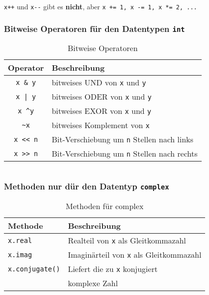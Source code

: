 \begin{achtung}
	\texttt{x++} und \texttt{x-{}-} gibt es \textbf{nicht}, aber \texttt{x += 1, x -= 1, x *= 2, ...}
\end{achtung}
\begin{minipage}[t]{0.49\textwidth}
	\subsubsection{Bitweise Operatoren für den Datentypen \texttt{int}}
	\begin{table}[H]
		\begin{threeparttable}
			\caption{Bitweise Operatoren}
			\begin{tabular}{|c|l|}
				\hline 
				\textbf{Operator} &\textbf{Beschreibung}\\ 
				\hline 
				\texttt{x \& y} &bitweises UND von \texttt{x} und \texttt{y}\\ 
				\texttt{x | y} &bitweises ODER von \texttt{x} und \texttt{y}\\
				\texttt{x \textasciicircum y} &bitweises EXOR von \texttt{x} und \texttt{y}\\ 
				\texttt{\textasciitilde x} &bitweises Komplement von \texttt{x}\\ 
				\texttt{x << n} &Bit-Verschiebung um \texttt{n} Stellen nach links\\ 
				\texttt{x >> n} &Bit-Verschiebung um \texttt{n} Stellen nach rechts\\ 
				\hline 
			\end{tabular}
		\end{threeparttable}
	\end{table}
\end{minipage}
\begin{minipage}[t]{0.02\textwidth} $ \quad $\end{minipage}
\begin{minipage}[t]{0.49\textwidth}
	\subsubsection{Methoden nur dür den Datentyp \texttt{complex}}
	\begin{table}[H]
		\begin{threeparttable}
			\caption{Methoden für complex}
			\begin{tabular}{|l|l|}
				\hline 
				\textbf{Methode} &\textbf{Beschreibung}\\ 
				\hline 
				\texttt{x.real} &Realteil von \texttt{x} als Gleitkommazahl\\
				\texttt{x.imag} &Imaginärteil von \texttt{x} als Gleitkommazahl\\ 
				\texttt{x.conjugate()} &Liefert die zu \texttt{x} konjugiert\\&komplexe Zahl\\  
				\hline 
			\end{tabular}
		\end{threeparttable}
	\end{table}
\end{minipage}

